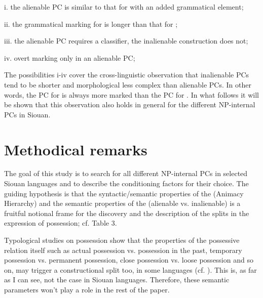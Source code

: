 \documentclass[output=paper]{LSP/langsci}
\begin{document}
\vspace{1em}
i.	the alienable PC is similar to that for  with an added grammatical element;

ii.	the grammatical marking for  is longer than that for ;

iii.	the alienable PC requires a classifier, the inalienable construction does not;

iv.	overt marking only in an alienable PC;
\vspace{1em}

The possibilities i-iv cover the cross-linguistic observation that inalienable PCs tend to be shorter and morphological less complex than alienable PCs. In other words, the PC for  is always more marked than the PC for . In what follows it will be shown that this observation also holds in general for the different NP-internal PCs in Siouan.

\section{Methodical remarks}

The goal of this study is to search for all different NP-internal PCs in selected Siouan languages and to describe the conditioning factors for their choice. The guiding hypothesis is that the syntactic/semantic properties of the  (Animacy Hierarchy) and the semantic properties of the  (alienable vs. inalienable) is a fruitful notional frame for the discovery and the description of the splits in the expression of possession; cf. Table 3. 
	
Typological studies on possession show that the properties of the possessive relation itself such as actual possession vs. possession in the past, temporary possession vs. permanent possession, close possession vs. loose possession and so on, may trigger a constructional split too, in some languages (cf. \citealt[274--276]{Dixon2010}). This is, as far as I can see, not the case in Siouan languages. Therefore, these semantic parameters won't play a role in the rest of the paper. 
\end{document}
